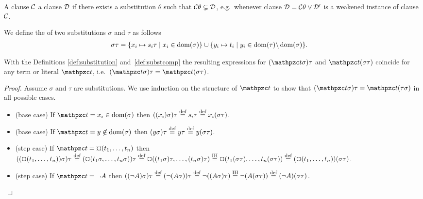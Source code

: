 \begin{definition}\label{def:strictly:subsumes}
	A clause \( \mcC \)  a clause \( \mcD \) if there exists a substitution \( \theta \) such that \( \mcC\theta \subsetneq \mcD \),
	e.g.~whenever clause \( \mcD = \mcC\theta \lor \mcD' \) is a weakened instance of clause \( \mcC \).
\end{definition}

\begin{definition}\label{def:substcomp}
We define the  of two substitutions \( \sigma \) and \( \tau \) as follows
	\begin{align*}
		\sigma\tau&=\{ x_i\mapsto s_i\tau\mid x_i\in\domain(\sigma) \}
		\cup
		\{ y_i\mapsto t_i\mid y_i\in\domain(\tau) \backslash \domain(\sigma) \}.
	\end{align*}
\end{definition}

\begin{lemma}\label{lem:substitution}
	With the Definitions \ref{def:substitution} and~\ref{def:substcomp} the resulting expressions for
	\( (\mct\sigma)\tau \) and \( \mct( \sigma\tau) \) coincide for
	any term or literal \( \mct \), i.e.~\( (\mct\sigma)\tau = \mct( \sigma\tau) \).
\end{lemma}

\begin{proof}
	Assume \( \sigma \) and \( \tau \) are substitutions.
	We use induction on the structure of \( \mct \)
	to show that
	\( (\mct\sigma)\tau = \mct(\tau\sigma) \) in all possible cases.
	\begin{itemize}
		\item (base case) If \( \mct = x_i \in\domain(\sigma) \) then
		\( ((x_i)\sigma)\tau\defEQ s_i\tau\defEQ x_i(\sigma\tau) \).

		\item (base case) If \( \mct = y \not\in\domain(\sigma) \) then
		\( (y\sigma)\tau \defEQ y\tau \defEQ y(\sigma\tau) \).

		\item (step case) If \( \mct = \Pf(t_1,\ldots,t_n) \)
		then
		\(
			((\Pf(t_1,\ldots,t_n))\sigma)\tau
		\defEQ
		(\Pf(t_1\sigma,\ldots,t_n\sigma))\tau
		\defEQ
		\Pf((t_1\sigma)\tau,\ldots,(t_n\sigma)\tau)
		\defEQ[IH]
		\Pf(t_1(\sigma\tau),\ldots,t_n(\sigma\tau))
		\defEQ
		(\Pf(t_1,\ldots,t_n))(\sigma\tau)
		\).

		\item (step case) If \( \mct = \lnot A \) then
		\(
		((\lnot A)\sigma)\tau
		\defEQ
		(\lnot(A\sigma))\tau
		\defEQ
		\lnot((A\sigma)\tau)
		\defEQ[IH]
		\lnot(A(\sigma\tau))
		\defEQ
		(\lnot A)(\sigma\tau)
		\).
	\end{itemize}
\end{proof}
